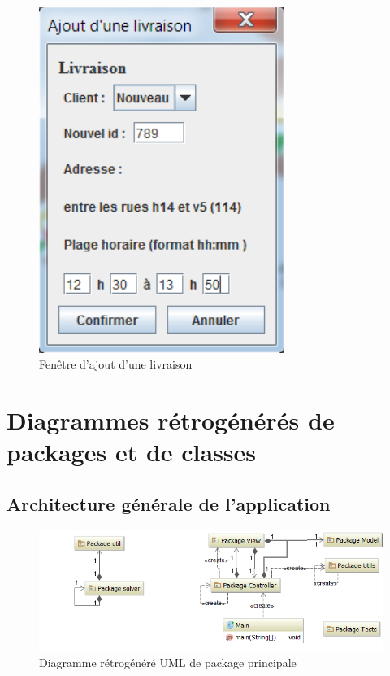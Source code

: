 \begin{figure}[h]
    \centering
    \includegraphics[width=80mm]{./images/screenshot3.png}
    \caption{Fenêtre d'ajout d'une livraison}
\end{figure}
\pagebreak


\section{Diagrammes r\'etrog\'en\'er\'es de packages et de classes}

\subsection{Architecture g\'en\'erale de l'application}

\begin{figure}[h]
    \centering
    \includegraphics[width=150mm]{../diagrams/classes_packages/final_classes_packages/packages.png}
    \caption{Diagramme r\'etrog\'en\'er\'e UML de package principale}
    \label{diagram:gen_uml_global}
\end{figure}
\pagebreak

